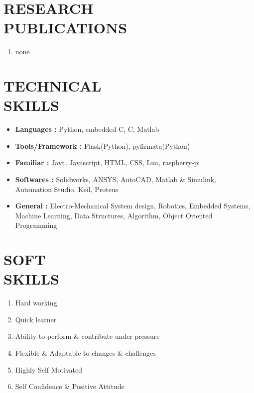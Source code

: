 \documentclass[margin]{res}
\begin{document}
    \section{RESEARCH \\ PUBLICATIONS}
    \begin{enumerate}
        \item none
    \end{enumerate}
  
    \section{TECHNICAL \\ SKILLS}
    \begin{itemize}
    \item \textbf{Languages : } Python, embedded C, C, Matlab 
    \item \textbf{Tools/Framework : } Flask(Python), pyfirmata(Python)
    \item \textbf{Familiar : } Java, Javascript, HTML, CSS, Lua, raspberry-pi  
    \item \textbf{Softwares :} Solidworks, ANSYS, AutoCAD, Matlab \& Simulink, Automation Studio, Keil, Proteus   
    \item \textbf{General : } Electro-Mechanical System design, Robotics, Embedded Systems, Machine Learning, 
                            Data Structures, Algorithm, Object Oriented Programming \\
    \end{itemize}
  
    \section{SOFT \\ SKILLS}
    \begin{enumerate}   
    \item {Hard working }
    \item {Quick learner }
    \item {Ability to perform \& contribute under pressure}
    \item {Flexible \& Adaptable to changes \& challenges}
    \item {Highly Self Motivated}
    \item {Self Confidence \& Positive Attitude}
    \end{enumerate}
  
\end{document}
